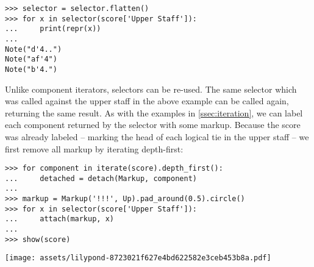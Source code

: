 \begin{comment}
<abjad>
selector = selector.flatten()
for x in selector(score['Upper Staff']):
    print(repr(x))

</abjad>
\end{comment}

\begin{abjadbookoutput}
\begin{singlespacing}
\vspace{-0.5\baselineskip}
\begin{verbatim}
>>> selector = selector.flatten()
>>> for x in selector(score['Upper Staff']):
...     print(repr(x))
...
Note("d'4..")
Note("af'4")
Note("b'4.")
\end{verbatim}
\end{singlespacing}
\end{abjadbookoutput}

\noindent Unlike component iterators, selectors can be re-used. The same
selector which was called against the upper staff in the above example can be
called again, returning the same result. As with the examples in
\autoref{ssec:iteration}, we can label each component returned by the selector
with some markup. Because the score was already labeled -- marking the head of
each logical tie in the upper staff -- we first remove all markup by iterating
depth-first:

\begin{comment}
<abjad>
for component in iterate(score).depth_first():
    detached = detach(Markup, component)

markup = Markup('!!!', Up).pad_around(0.5).circle()
for x in selector(score['Upper Staff']):
    attach(markup, x)

show(score)
</abjad>
\end{comment}

\begin{abjadbookoutput}
\begin{singlespacing}
\vspace{-0.5\baselineskip}
\begin{verbatim}
>>> for component in iterate(score).depth_first():
...     detached = detach(Markup, component)
...
>>> markup = Markup('!!!', Up).pad_around(0.5).circle()
>>> for x in selector(score['Upper Staff']):
...     attach(markup, x)
...
>>> show(score)
\end{verbatim}
\noindent\texttt{[image: assets/lilypond-8723021f627e4bd622582e3ceb453b8a.pdf]}
\end{singlespacing}
\end{abjadbookoutput}

